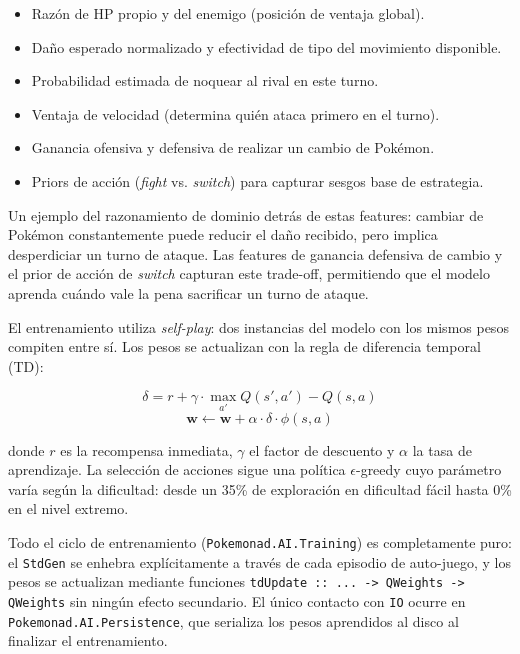 \begin{itemize}
    \item Razón de HP propio y del enemigo (posición de ventaja global).
    \item Daño esperado normalizado y efectividad de tipo del movimiento disponible.
    \item Probabilidad estimada de noquear al rival en este turno.
    \item Ventaja de velocidad (determina quién ataca primero en el turno).
    \item Ganancia ofensiva y defensiva de realizar un cambio de Pokémon.
    \item Priors de acción (\textit{fight} vs. \textit{switch}) para capturar sesgos base de estrategia.
\end{itemize}

Un ejemplo del razonamiento de dominio detrás de estas features: cambiar de Pokémon constantemente puede reducir el daño recibido, pero implica desperdiciar un turno de ataque. Las features de ganancia defensiva de cambio y el prior de acción de \textit{switch} capturan este trade-off, permitiendo que el modelo aprenda cuándo vale la pena sacrificar un turno de ataque.

\medskip

El entrenamiento utiliza \textit{self-play}: dos instancias del modelo con los mismos pesos compiten entre sí. Los pesos se actualizan con la regla de diferencia temporal (TD):

\[ \delta = r + \gamma \cdot \max_{a'} Q(s', a') - Q(s, a) \]
\[ \mathbf{w} \leftarrow \mathbf{w} + \alpha \cdot \delta \cdot \phi(s,a) \]

donde $r$ es la recompensa inmediata, $\gamma$ el factor de descuento y $\alpha$ la tasa de aprendizaje. La selección de acciones sigue una política $\epsilon$-greedy cuyo parámetro varía según la dificultad: desde un 35\% de exploración en dificultad fácil hasta 0\% en el nivel extremo.

Todo el ciclo de entrenamiento (\texttt{Pokemonad.AI.Training}) es completamente puro: el \texttt{StdGen} se enhebra explícitamente a través de cada episodio de auto-juego, y los pesos se actualizan mediante funciones \texttt{tdUpdate :: ... -> QWeights -> QWeights} sin ningún efecto secundario. El único contacto con \texttt{IO} ocurre en \texttt{Pokemonad.AI.Persistence}, que serializa los pesos aprendidos al disco al finalizar el entrenamiento.

\clearpage
